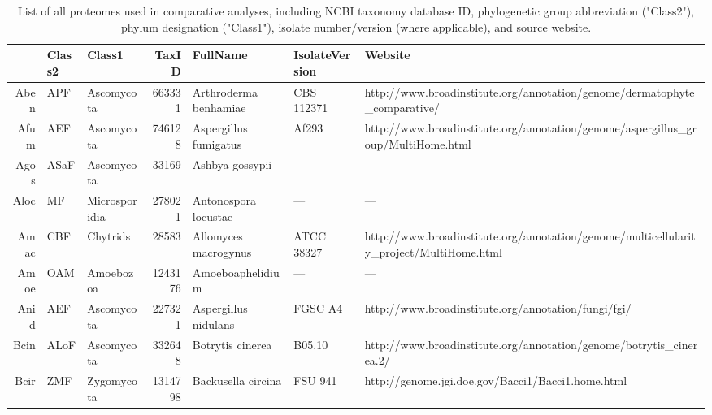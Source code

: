 
\centering
{\footnotesize
{\setlength{\tabcolsep}{1pt}
\begin{longtable}{rllrlll}
\caption[List of proteomes used in comparative analyses.]{List of all proteomes used in comparative analyses, including NCBI taxonomy database ID, phylogenetic group abbreviation ("Class2"), phylum designation ("Class1"), isolate number/version (where applicable), and source website.} \label{tab:AppData_taxa} \\
  \hline
\hline
 & Class2 & Class1 & TaxID & FullName & IsolateVersion & Website \\ 
  \hline
Aben & APF & Ascomycota & 663331 & Arthroderma benhamiae & CBS 112371 & http://www.broadinstitute.org/annotation/genome/dermatophyte\_comparative/ \\ 
  Afum & AEF & Ascomycota & 746128 & Aspergillus fumigatus & Af293 & http://www.broadinstitute.org/annotation/genome/aspergillus\_group/MultiHome.html \\ 
  Agos & ASaF & Ascomycota & 33169 & Ashbya gossypii & --- & --- \\ 
  Aloc & MF & Microsporidia & 278021 & Antonospora locustae & --- & --- \\ 
  Amac & CBF & Chytrids & 28583 & Allomyces macrogynus & ATCC 38327 & http://www.broadinstitute.org/annotation/genome/multicellularity\_project/MultiHome.html \\ 
  Amoe & OAM & Amoebozoa & 1243176 & Amoeboaphelidium & --- & --- \\ 
  Anid & AEF & Ascomycota & 227321 & Aspergillus nidulans & FGSC A4 & http://www.broadinstitute.org/annotation/fungi/fgi/ \\ 
  Bcin & ALoF & Ascomycota & 332648 & Botrytis cinerea & B05.10 & http://www.broadinstitute.org/annotation/genome/botrytis\_cinerea.2/ \\ 
  Bcir & ZMF & Zygomycota & 1314798 & Backusella circina & FSU 941 & http://genome.jgi.doe.gov/Bacci1/Bacci1.home.html \\ 

\end{longtable}}}
